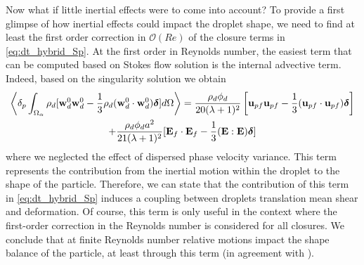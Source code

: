 Now what if little inertial effects were to come into account?
To provide a first glimpse of how inertial effects could impact the droplet shape, we need to find at least the first order correction in $\mathcal{O}(Re)$ of the closure terms in \ref{eq:dt_hybrid_Sp}. 
At the first order in Reynolds number, the easiest term that can be computed based on Stokes flow solution is the internal advective term. 
Indeed, based on the singularity solution we obtain
\begin{multline}
    \pOavg{\rho_d [\textbf{w}_d^0  \textbf{w}_d^0  - \frac{1}{3}\rho_d (\textbf{w}_d^0 \cdot \textbf{w}_d^0)\bm\delta]}
    = 
    \frac{\rho_d \phi_d}{20(\lambda +1 )^2}
    \left[
        \textbf{u}_{p f}\textbf{u}_{p f} 
    -\frac{1}{3} (\textbf{u}_{p f}\cdot \textbf{u}_{p f})\bm\delta
    \right]\\
    + \frac{\rho_d \phi_d a^2}{21 (\lambda + 1)^2}[\textbf{E}_f\cdot \textbf{E}_f - \frac{1}{3}(\textbf{E}:\textbf{E})\bm\delta]
    \label{eq:vv_closure}
\end{multline}
where we neglected the effect of dispersed phase velocity variance. 
This term represents the contribution from the inertial motion within the droplet to the shape of the particle. 
Therefore, we can state that the contribution of this term in \ref{eq:dt_hybrid_Sp} induces a coupling between droplets translation mean shear and deformation. 
Of course, this term is only useful in the context where the first-order correction in the Reynolds number is considered for all closures. 
We conclude that at finite Reynolds number relative motions impact the shape balance of the particle, at least through this term (in agreement with \citet{taylor1964deformation}). 
